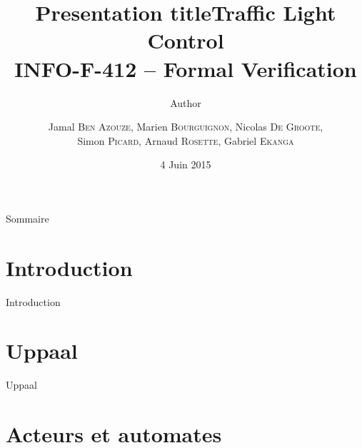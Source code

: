 \documentclass{beamer} %
\author{Author}
\title{Presentation title}
\begin{document}
\title[INFO-F-412 - Traffic Light Control]{\textbf{Traffic Light Control} \\INFO-F-412 -- Formal Verification} %

\author{Jamal \textsc{Ben Azouze}, Marien \textsc{Bourguignon}, Nicolas \textsc{De Groote}, \\Simon \textsc{Picard}, Arnaud \textsc{Rosette}, Gabriel \textsc{Ekanga}}
\date{4 Juin 2015} %

\begin{frame}
\titlepage %
\end{frame}

\begin{frame}{Sommaire}
\tableofcontents %
\end{frame}

\section{Introduction}
\begin{frame}{Introduction}

\end{frame}

\section{Uppaal}
\begin{frame}{Uppaal}

\end{frame}

\section{Acteurs et automates}
\end{document}
